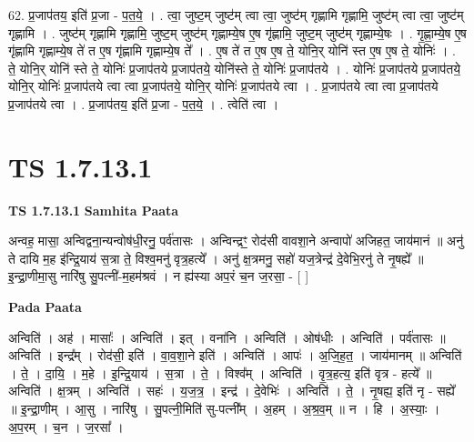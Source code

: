 \documentclass[17pt]{extarticle}
\begin{document}
62. प्र॒जाप॑तय॒ इति॑ प्र॒जा - प॒त॒ये॒ । . त्वा॒ जुष्ट॒म् जुष्ट॑म् त्वा त्वा॒ जुष्ट॑म् गृह्णामि गृह्णामि॒ जुष्ट॑म् त्वा त्वा॒ जुष्ट॑म् गृह्णामि । . जुष्ट॑म् गृह्णामि गृह्णामि॒ जुष्ट॒म् जुष्ट॑म् गृह्णाम्ये॒ष ए॒ष गृ॑ह्णामि॒ जुष्ट॒म् जुष्ट॑म् गृह्णाम्ये॒षः । . गृ॒ह्णा॒म्ये॒ष ए॒ष गृ॑ह्णामि गृह्णाम्ये॒ष ते॑ त ए॒ष गृ॑ह्णामि गृह्णाम्ये॒ष ते᳚ । . ए॒ष ते॑ त ए॒ष ए॒ष ते॒ योनि॒र् योनि॑ स्त ए॒ष ए॒ष ते॒ योनिः॑ । . ते॒ योनि॒र् योनि॑ स्ते ते॒ योनिः॑ प्र॒जाप॑तये प्र॒जाप॑तये॒ योनि॑स्ते ते॒ योनिः॑ प्र॒जाप॑तये । . योनिः॑ प्र॒जाप॑तये प्र॒जाप॑तये॒ योनि॒र् योनिः॑ प्र॒जाप॑तये त्वा त्वा प्र॒जाप॑तये॒ योनि॒र् योनिः॑ प्र॒जाप॑तये त्वा । . प्र॒जाप॑तये त्वा त्वा प्र॒जाप॑तये प्र॒जाप॑तये त्वा । . प्र॒जाप॑तय॒ इति॑ प्र॒जा - प॒त॒ये॒ । . त्वेति॑ त्वा । \newline
\pagebreak
{}

\section{ TS 1.7.13.1 }

\textbf{TS 1.7.13.1 } \newline
\textbf{Samhita Paata} \newline

अन्वह॒ मासा॒ अन्विद्वना॒न्यन्वोष॑धी॒रनु॒ पर्व॑तासः । अन्विन्द्रꣳ॒॒ रोद॑सी वावशा॒ने अन्वापो॑ अजिहत॒ जाय॑मानं ॥ अनु॑ ते दायि म॒ह इ॑न्द्रि॒याय॑ स॒त्रा ते॒ विश्व॒मनु॑ वृत्र॒हत्ये᳚ । अनु॑ क्ष॒त्रमनु॒ सहो॑ यज॒त्रेन्द्र॑ दे॒वेभि॒रनु॑ ते नृ॒षह्ये᳚ ॥ इ॒न्द्रा॒णीमा॒सु नारि॑षु सु॒पत्नी॑-म॒हम॑श्रवं । न ह्य॑स्या अप॒रं च॒न ज॒रसा॒ - [ ] \newline

\textbf{Pada Paata} \newline

अन्विति॑ । अह॑ । मासाः᳚ । अन्विति॑ । इत् । वना॑नि । अन्विति॑ । ओष॑धीः । अन्विति॑ । पर्व॑तासः ॥ अन्विति॑ । इन्द्र᳚म् । रोद॑सी॒ इति॑ । वा॒व॒शा॒ने इति॑ । अन्विति॑ । आपः॑ । अ॒जि॒ह॒त॒ । जाय॑मानम् ॥ अन्विति॑ । ते॒ । दा॒यि॒ । म॒हे । इ॒न्द्रि॒याय॑ । स॒त्रा । ते॒ । विश्व᳚म् । अन्विति॑ । वृ॒त्र॒हत्य॒ इति॑ वृत्र - हत्ये᳚ ॥ अन्विति॑ । क्ष॒त्रम् । अन्विति॑ । सहः॑ । य॒ज॒त्र॒ । इन्द्र॑ । दे॒वेभिः॑ । अन्विति॑ । ते॒ । नृ॒षह्य॒ इति॑ नृ - सह्ये᳚ ॥ इ॒न्द्रा॒णीम् । आ॒सु । नारि॑षु । सु॒पत्नी॒मिति॑ सु-पत्नी᳚म् । अ॒हम् । अ॒श्र॒व॒म् ॥ न । हि । अ॒स्याः॒ । अ॒प॒रम् । च॒न । ज॒रसा᳚ ।  \newline
\end{document}
